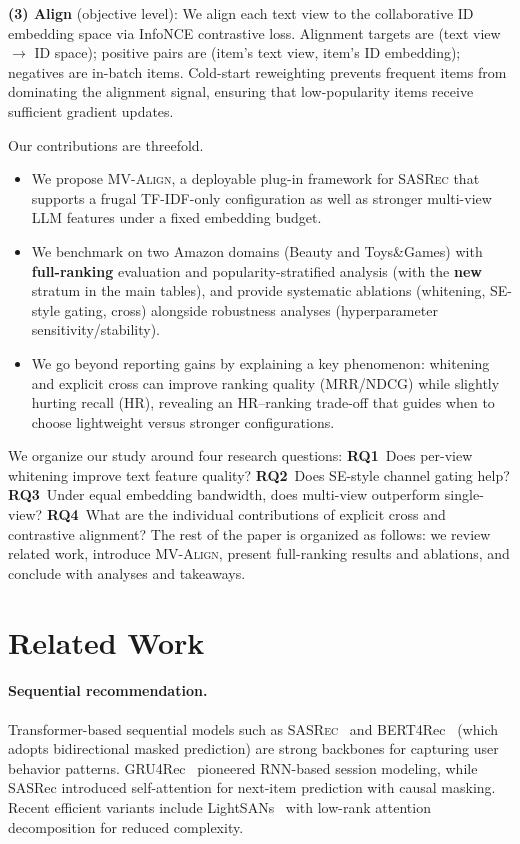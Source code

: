 \documentclass[sigconf,natbib=true,anonymous]{acmart}
\newcommand{\model}{\textsc{MV-Align}\xspace}
\newcommand{\base}{\textsc{SASRec}\xspace}
\newcommand{\tfidf}{\textsc{TF-IDF}\xspace}
\newcommand{\llm}{\textsc{LLM}\xspace}
\begin{document}
\textbf{(3) Align} (objective level): We align each text view
to the collaborative ID embedding space via InfoNCE contrastive
loss. Alignment targets are (text view $\to$ ID space); positive
pairs are (item's text view, item's ID embedding); negatives are
in-batch items. Cold-start reweighting prevents frequent items
from dominating the alignment signal, ensuring that
low-popularity items receive sufficient gradient updates.

Our contributions are threefold.
\begin{itemize}[leftmargin=*,itemsep=1pt]
  \item We propose \model, a deployable plug-in framework for
    \base that supports a frugal \tfidf-only configuration as
    well as stronger multi-view \llm features under a fixed
    embedding budget.
  \item We benchmark on two Amazon domains (Beauty and
    Toys\&Games) with \textbf{full-ranking} evaluation and
    popularity-stratified analysis (with the \textbf{new} stratum in the main tables), and provide systematic
    ablations (whitening, SE-style gating, cross) alongside robustness
    analyses (hyperparameter sensitivity/stability).
  \item We go beyond reporting gains by explaining a key
    phenomenon: whitening and explicit cross can improve
    ranking quality (MRR/NDCG) while slightly hurting recall
    (HR), revealing an HR--ranking trade-off that guides when
    to choose lightweight versus stronger configurations.
\end{itemize}
We organize our study around four research questions:
\textbf{RQ1}~Does per-view whitening improve text feature quality?
\textbf{RQ2}~Does SE-style channel gating help?
\textbf{RQ3}~Under equal embedding bandwidth, does multi-view outperform single-view?
\textbf{RQ4}~What are the individual contributions of explicit cross and contrastive alignment?
The rest of the paper is organized as follows: we review
related work, introduce \model, present full-ranking results
and ablations, and conclude with analyses and takeaways.


\section{Related Work}
\paragraph{Sequential recommendation.}
Transformer-based sequential models such as
\base~\cite{kang2018sasrec} and BERT4Rec~\cite{sun2019bert4rec}
(which adopts bidirectional masked prediction) are strong backbones for
capturing user behavior patterns.
GRU4Rec~\cite{hidasi2016gru4rec} pioneered RNN-based session
modeling, while SASRec introduced self-attention for next-item
prediction with causal masking. Recent efficient variants
include LightSANs~\cite{fan2021lightsans} with low-rank
attention decomposition for reduced complexity.
\end{document}
